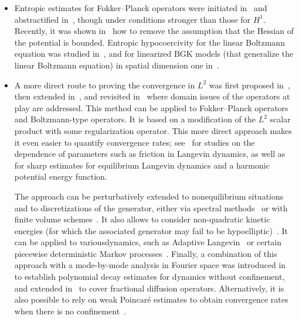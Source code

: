 \documentclass[AHL,Unicode,longabstracts,MathTools,published]{cedram}
\begin{document}
\begin{itemize}
Exponential convergence in $H^1$ can be established using only $L^2$ bounds on the initial data by hypoelliptic regularization~\cite{Herau07}. The latter technique can also be adapted to discretization schemes~\cite{PZ17}.

\item Entropic estimates for Fokker--Planck operators were initiated in~\cite{DV01} and abstractified in~\cite{Villani09}, though under conditions stronger than those for $H^1$. Recently, it was shown in~\cite{CGMZ19} how to remove the assumption that the Hessian of the potential is bounded. Entropic hypocoercivity for the linear Boltzmann equation was studied in~\cite{Ev17,Mon17}, and for linearized BGK models (that generalize the linear Boltzmann equation) in spatial dimension one in~\cite{AAC16}.

\item A more direct route to proving the convergence in $L^2$ was first proposed in~\cite{Herau06}, then extended in~\cite{DMS09,DMS15}, and revisited in~\cite{GS16} where domain issues of the operators at play are addressed. This method can be applied to Fokker--Planck operators and Boltzmann-type operators. It is based on a modification of the $L^2$ scalar product with some regularization operator. This more direct approach makes it even easier to quantify convergence rates; see~\cite{DKMS13,GS16} for studies on the dependence of parameters such as friction in Langevin dynamics, as well as~\cite{AAS15,ASS20} for sharp estimates for equilibrium Langevin dynamics and a harmonic potential energy function.

The approach can be perturbatively extended to nonequilibrium situations~\cite{BHM17,IOS19,SV18} and to discretizations of the generator, either via spectral methods~\cite{RS18} or with finite volume schemes~\cite{BCHR19}. It also allows to consider non-quadratic kinetic energies (for which the associated generator may fail to be hypoelliptic)~\cite{ST18}. It can be applied to various\linebreak dynamics, such as Adaptive Langevin~\cite{LSS19} or certain piecewise deterministic Markov processes~\cite{ADNR18}. Finally, a combination of this approach with a mode-by-mode analysis in Fourier space was introduced in~\cite{BDMMS17} to establish polynomial decay estimates for dynamics without confinement, and extended in~\cite{BDLS19} to cover fractional diffusion operators. Alternatively, it is also possible to rely on weak Poincaré estimates to obtain convergence rates when there is no confinement~\cite{GW19}.


\end{itemize}
\end{document}
